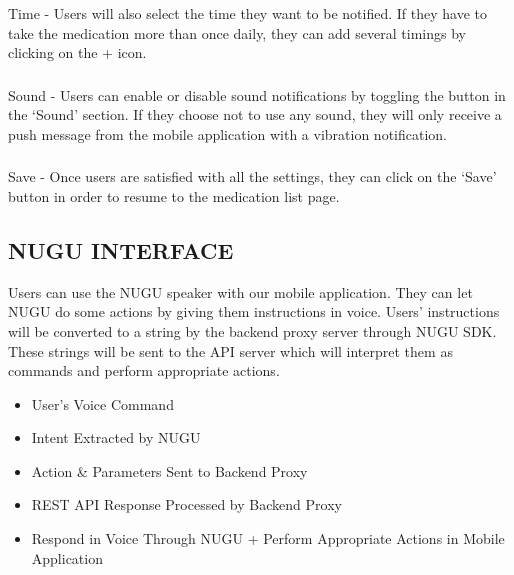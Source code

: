 \documentclass[conference]{IEEEtran}
\begin{document}
\subsubsection{}Time - Users will also select the time they want to be notified. If they have to take the medication more than once daily, they can add several timings by clicking on the + icon. \\

\subsubsection{}Sound - Users can enable or disable sound notifications by toggling the button in the ‘Sound’ section. If they choose not to use any sound, they will only receive a push message from the mobile application with a vibration notification. \\

\subsubsection{}Save - Once users are satisfied with all the settings, they can click on the ‘Save’ button in order to resume to the medication list page.\\



\subsection{NUGU INTERFACE}Users can use the NUGU speaker with our mobile application. They can let NUGU do some actions by giving them instructions in voice. Users’ instructions will be converted to a string by the backend proxy server through NUGU SDK. These strings will be sent to the API server which will interpret them as commands and perform appropriate actions.\\





\begin{itemize}%
  \renewcommand{\labelitemi}{$\rightarrow$}
 \item User’s Voice Command \\
 
 \item Intent Extracted by NUGU\\
 
 \item Action & Parameters Sent to Backend Proxy\\
 
 \item REST API Response Processed by Backend Proxy\\
 
 \item Respond in Voice Through NUGU + Perform Appropriate Actions in Mobile Application\\
\end{itemize}
\end{document}
